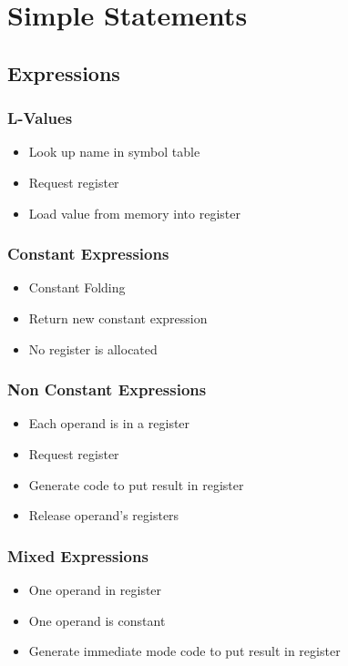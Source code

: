 \documentclass[usepdftitle=false,professionalfonts,compress ]{beamer}
\begin{document}
\section{Simple Statements}
		
\subsection{Expressions}

{
\begin{frame}\frametitle{L-Values}

	\begin{itemize}
	\item Look up name in symbol table
			\item Request register
			\item Load value from memory into register
				\end{itemize}

\end{frame}}





{
\begin{frame}\frametitle{Constant Expressions}

	\begin{itemize}
	\item Constant Folding
			\item Return new constant expression
			\item No register is allocated
				\end{itemize}

\end{frame}}





{
\begin{frame}\frametitle{Non Constant Expressions}

	\begin{itemize}
	\item Each operand is in a register
			\item Request register
			\item Generate code to put result in register
			\item Release operand's registers
				\end{itemize}

\end{frame}}






{
\begin{frame}\frametitle{Mixed Expressions}

	\begin{itemize}
	\item One operand in register
			\item One operand is constant
			\item Generate immediate mode code to put result in register
				\end{itemize}

\end{frame}}
\end{document}
